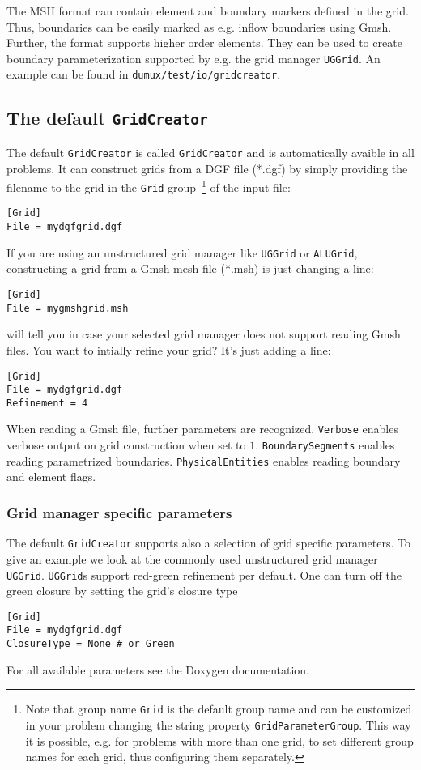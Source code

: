 The MSH format can contain element and boundary markers defined in the grid. Thus, boundaries can be easily marked as e.g. inflow boundaries
using Gmsh. Further, the format supports higher order elements. They can be used to create boundary parameterization supported by e.g. the grid
manager \texttt{UGGrid}.
An example can be found in \texttt{dumux/test\allowbreak/io/gridcreator}.



\subsection{The default \texttt{GridCreator}}
The default \texttt{GridCreator} is called \texttt{GridCreator} and is automatically avaible in all problems.
It can construct grids from a DGF file (*.dgf) by simply providing the filename to the grid in the \texttt{Grid} group~\footnote{Note
that group name \texttt{Grid} is the default group name and can be customized in your problem changing the string property \texttt{GridParameterGroup}.
This way it is possible, e.g. for problems with more than one grid, to set different group names for each grid, thus configuring them separately.}
of the input file:
\begin{lstlisting}[style=DumuxParameterFile]
[Grid]
File = mydgfgrid.dgf
\end{lstlisting}
If you are using an unstructured grid manager like \texttt{UGGrid} or \texttt{ALUGrid}, constructing a grid from a Gmsh mesh file (*.msh) is just changing a line:
\begin{lstlisting}[style=DumuxParameterFile]
[Grid]
File = mygmshgrid.msh
\end{lstlisting}
\Dumux will tell you in case your selected grid manager does not support reading Gmsh files. You want to intially refine your grid? It's just adding a line:
\begin{lstlisting}[style=DumuxParameterFile]
[Grid]
File = mydgfgrid.dgf
Refinement = 4
\end{lstlisting}
When reading a Gmsh file, further parameters are recognized. \texttt{Verbose} enables verbose output on grid construction when set to $1$.
\texttt{BoundarySegments} enables reading parametrized boundaries. \texttt{PhysicalEntities} enables reading boundary and element flags.

\subsubsection{Grid manager specific parameters}
The default \texttt{GridCreator} supports also a selection of grid specific parameters.
To give an example we look at the commonly used unstructured grid manager \texttt{UGGrid}.
\texttt{UGGrid}s support red-green refinement per default. One can turn off the green closure by setting the grid's closure type
\begin{lstlisting}[style=DumuxParameterFile]
[Grid]
File = mydgfgrid.dgf
ClosureType = None # or Green
\end{lstlisting}
For all available parameters see the Doxygen documentation.

